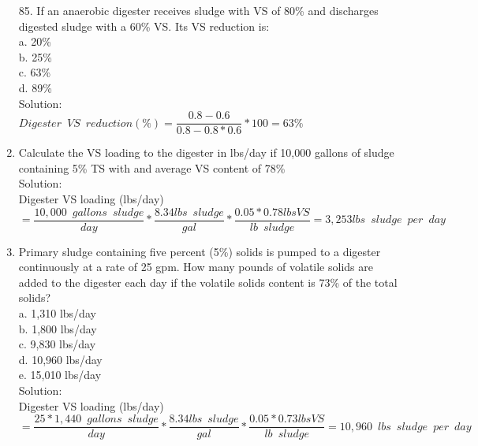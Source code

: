 \documentclass{article}
\begin{document}
\begin{enumerate}
85. If an anaerobic digester receives sludge with VS of 80\% and discharges digested sludge with a 60\% VS. Its VS reduction is:\\
a. 20\% \\
b. 25\% \\
c. 63\% \\
d. 89\% \\
\vspace{0.5cm}
Solution:\\
\vspace{0.5cm}
$Digester \enspace VS \enspace reduction (\%)=\dfrac{0.8-0.6}{0.8-0.8*0.6}*100=\boxed{ 63\%}$\\

\vspace{0.5cm}
\item Calculate the VS loading to the digester in lbs/day if 10,000 gallons of sludge containing 5\% TS with and average VS content of 78\%\\
Solution:\\
Digester VS loading (lbs/day)\\$=\dfrac{10,000 \enspace gallons \enspace sludge}{day}*\dfrac{8.34lbs \enspace sludge}{gal}*\dfrac{0.05*0.78lbs VS}{lb \enspace sludge}=\boxed{3,253lbs \enspace sludge \enspace per \enspace day}$

\item Primary sludge containing five percent (5\%) solids is pumped to a digester continuously at a rate of 25 gpm. How many pounds of volatile solids are added to the digester each day if the volatile solids content is 73\% of the total solids?\\
a. 1,310 lbs/day \\
b. 1,800 lbs/day \\
c. 9,830 lbs/day \\
d. 10,960 lbs/day \\
e. 15,010 lbs/day \\
\vspace{0.5cm}
Solution:\\
\vspace{0.5cm}
Digester VS loading (lbs/day)\\$=\dfrac{25*1,440 \enspace gallons \enspace sludge}{day}*\dfrac{8.34lbs \enspace sludge}{gal}*\dfrac{0.05*0.73lbs VS}{lb \enspace sludge}=\boxed{10,960 \enspace lbs \enspace sludge \enspace per \enspace day}$\\
\vspace{0.5cm}







\end{enumerate}
\end{document}
